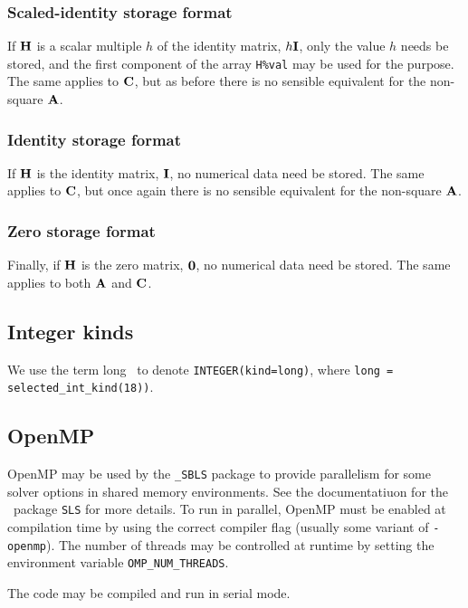 \documentclass{galahad}
\newcommand{\packagename}{SBLS}
\newcommand{\fullpackagename}{\libraryname\_\packagename}
\begin{document}
\subsubsection{Scaled-identity storage format}\label{scaled}
If ${\mathbf{H}}$ is a scalar multiple $h$ of the identity matrix, $h {\mathbf{I}}$,
only the value $h$ needs be stored,
and the first component of the array {\tt H\%val}
 may be used for
the purpose. The same applies to ${\mathbf{C}}$, but
as before there is no sensible equivalent for the non-square ${\mathbf{A}}$.

\subsubsection{Identity storage format}\label{identity}
If ${\mathbf{H}}$ is the identity matrix, ${\mathbf{I}}$,
no numerical data need be stored. The same applies to ${\mathbf{C}}$, but
once again there is no sensible equivalent for the non-square ${\mathbf{A}}$.

\subsubsection{Zero storage format}\label{zero}
Finally, if ${\mathbf{H}}$ is the zero matrix, ${\mathbf{0}}$,
no numerical data need be stored. The same applies to both ${\mathbf{A}}$ and ${\mathbf{C}}$.

\subsection{Integer kinds}\label{Integer kinds}
We use the term
long \integer\ to denote {\tt INTEGER\-(kind=long)}, where
{\tt long = selected\_int\_kind(18))}.


\subsection{OpenMP}
OpenMP may be used by the {\tt \fullpackagename} package to provide
parallelism for some solver options in shared memory environments.
See the documentatiuon for the \galahad\ package {\tt SLS} for more details.
To run in parallel, OpenMP
must be enabled at compilation time by using the correct compiler flag
(usually some variant of {\tt -openmp}).
The number of threads may be controlled at runtime
by setting the environment variable {\tt OMP\_NUM\_THREADS}.

\noindent
The code may be compiled and run in serial mode.
\end{document}
